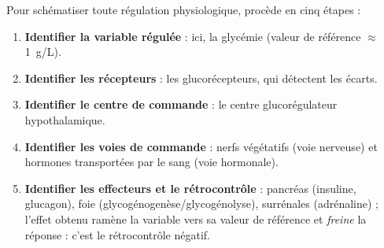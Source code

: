 \documentclass[11pt]{article}
\newcommand{\cle}[1]{{\popxbold\color{popdark}#1}}
\begin{document}
\begin{methode}
Pour schématiser toute régulation physiologique, procède en cinq étapes :
\begin{enumerate}
\item \textbf{Identifier la variable régulée} : ici, la glycémie (valeur de référence $\approx$ \SI{1}{g/L}).
\item \textbf{Identifier les récepteurs} : les glucorécepteurs, qui détectent les écarts.
\item \textbf{Identifier le centre de commande} : le centre glucorégulateur hypothalamique.
\item \textbf{Identifier les voies de commande} : nerfs végétatifs (voie nerveuse) et hormones transportées par le sang (voie hormonale).
\item \textbf{Identifier les effecteurs et le rétrocontrôle} : pancréas (insuline, glucagon), foie (glycogénogenèse/glycogénolyse), surrénales (adrénaline) ; l'effet obtenu ramène la variable vers sa valeur de référence et \emph{freine} la réponse : c'est le \cle{rétrocontrôle négatif}.
\end{enumerate}
\end{methode}
\end{document}

